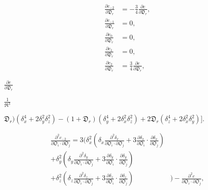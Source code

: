 \documentclass[a4paper,11pt,twoside,openright]{book}
\def\lthtmlcheckvsize{\ifdim\ht\sizebox<\vsize 
  \ifdim\wd\sizebox<\hsize\expandafter\hfill\fi \expandafter\vfill
  \else\expandafter\vss\fi}%
\begin{document}
{\newpage\clearpage
\setcounter{equation}{121}
%
\begin{subequations}\begin{align}
\frac{\partial c_{-2}}{\partial \mathfrak{D}_r} &= -\frac{3}{4} \frac{\partial e}{\partial \mathfrak{D}_r}, \\
\frac{\partial c_{-1}}{\partial \mathfrak{D}_r} &= 0, \\
\frac{\partial c_{0}}{\partial \mathfrak{D}_r}  &= 0, \\
\frac{\partial c_{1}}{\partial \mathfrak{D}_r}  &= 0, \\
\frac{\partial c_{2}}{\partial \mathfrak{D}_r}  &= \frac{3}{4} \frac{\partial e}{\partial \mathfrak{D}_r},
\end{align}\end{subequations}%
\lthtmldisplayZ
\lthtmlcheckvsize\clearpage}

{\newpage\clearpage
{}%
$\displaystyle {\frac{{\partial e}}{{\partial \mathfrak{D}_r}}}$%
\lthtmlindisplaymathZ
\lthtmlcheckvsize\clearpage}

{\newpage\clearpage
{}%
$\displaystyle {\frac{{1}}{{\mathfrak{R}^3}}}$%
\lthtmlindisplaymathZ
\lthtmlcheckvsize\clearpage}

{\newpage\clearpage
{}%
$\displaystyle \mathfrak{D}_r) \left(\delta_x^4 + 2\delta_y^2\delta_z^2\right)
- (1 + \mathfrak{D}_r) \left(\delta_y^4 + 2\delta_x^2\delta_z^2\right) + 2 \mathfrak{D}_r \left(\delta_z^4 + 2\delta_x^2\delta_y^2\right) \bigg].$%
\lthtmlindisplaymathZ
\lthtmlcheckvsize\clearpage}

{\newpage\clearpage
\setcounter{equation}{123}
%
\begin{subequations}\begin{align}
\frac{\partial^2 c_{-2}}{\partial \mathfrak{O}_i \cdot \partial \mathfrak{O}_j}  =  3 \Bigg(
\delta_x^2 \left( \delta_x \frac{\partial^2 \delta_x}{\partial \mathfrak{O}_i \cdot \partial \mathfrak{O}_j}
+  3 \frac{\partial \delta_x}{\partial \mathfrak{O}_i} \cdot \frac{\partial \delta_x}{\partial \mathfrak{O}_j} \right) &  \\
+  \delta_y^2 \left( \delta_y \frac{\partial^2 \delta_y}{\partial \mathfrak{O}_i \cdot \partial \mathfrak{O}_j}
+  3 \frac{\partial \delta_y}{\partial \mathfrak{O}_i} \cdot \frac{\partial \delta_y}{\partial \mathfrak{O}_j} \right) & \nonumber \\
+  \delta_z^2 \left( \delta_z \frac{\partial^2 \delta_z}{\partial \mathfrak{O}_i \cdot \partial \mathfrak{O}_j}
+  3 \frac{\partial \delta_z}{\partial \mathfrak{O}_i} \cdot \frac{\partial \delta_z}{\partial \mathfrak{O}_j} \right) &
\Bigg)  -  \frac{\partial^2 e}{\partial \mathfrak{O}_i \cdot \partial \mathfrak{O}_j},
\end{align}\end{subequations}%
\lthtmldisplayZ
\lthtmlcheckvsize\clearpage}
\end{document}

